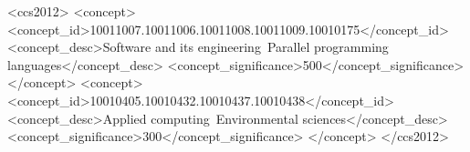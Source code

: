 \documentclass[sigconf]{acmart}
\begin{document}
%
%
\begin{CCSXML}
<ccs2012>
<concept>
<concept_id>10011007.10011006.10011008.10011009.10010175</concept_id>
<concept_desc>Software and its engineering~Parallel programming languages</concept_desc>
<concept_significance>500</concept_significance>
</concept>
<concept>
<concept_id>10010405.10010432.10010437.10010438</concept_id>
<concept_desc>Applied computing~Environmental sciences</concept_desc>
<concept_significance>300</concept_significance>
</concept>
</ccs2012>
\end{CCSXML}



\maketitle





\end{document}

